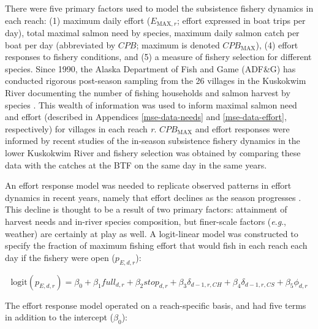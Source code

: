 \documentclass[12pt,]{book}
\theoremstyle{definition}
\theoremstyle{definition}
\theoremstyle{definition}
\theoremstyle{remark}
\begin{document}
\noindent
There were five primary factors used to model the subsistence fishery
dynamics in each reach: (1) maximum daily effort (\(E_{\text{MAX},r}\);
effort expressed in boat trips per day), total maximal salmon need by
species, maximum daily salmon catch per boat per day (abbreviated by
\(CPB\); maximum is denoted \(CPB_{\text{MAX}}\)), (4) effort responses
to fishery conditions, and (5) a measure of fishery selection for
different species. Since 1990, the Alaska Department of Fish and Game
(ADF\&G) has conducted rigorous post-season sampling from the 26
villages in the Kuskokwim River documenting the number of fishing
households and salmon harvest by species \citetext{\citealp[these
estimates are presented
in][]{hamazaki-2011}; \citealp{carroll-hamazaki-2012}; \citealp{shelden-etal-2014}; \citealp{shelden-etal-2015}; \citealp{shelden-etal-2016a}; \citealp[and][]{shelden-etal-2016b}}.
This wealth of information was used to inform maximal salmon need and
effort (described in Appendices \ref{mse-data-needs} and
\ref{mse-data-effort}, respectively) for villages in each reach
\emph{r}. \(CPB_{\text{MAX}}\) and effort responses were informed by
recent studies of the in-season subsistence fishery dynamics in the
lower Kuskokwim River
\citep{staton-coggins-2016, staton-coggins-2017, staton-2018} and
fishery selection was obtained by comparing these data with the catches
at the BTF on the same day in the same years.

An effort response model was needed to replicate observed patterns in
effort dynamics in recent years, namely that effort declines as the
season progresses
\citep{staton-coggins-2016, staton-coggins-2017, staton-2018}. This
decline is thought to be a result of two primary factors: attainment of
harvest needs and in-river species composition, but finer-scale factors
(\emph{e}.\emph{g}., weather) are certainly at play as well. A
logit-linear model was constructed to specify the fraction of maximum
fishing effort that would fish in each reach each day if the fishery
were open (\(p_{E,d,r}\)):

\begin{equation}
  \text{logit}(p_{E,d,r})=\beta_0 + \beta_1 full_{d,r} + \beta_2 stop_{d,r} + \beta_3 \delta_{d-1,r,CH} + \beta_4 \delta_{d-1,r,CS} + \beta_5 \phi_{d,r}
  \label{eq:effort-response}
\end{equation}

\noindent
The effort response model operated on a reach-specific basis, and had
five terms in addition to the intercept (\(\beta_0\)):
\end{document}
